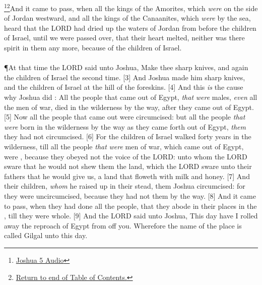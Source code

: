 \footnote{\href{https://audiobible.com/bible/joshua_5.html}{\textcolor[cmyk]{0.99998,1,0,0}{Joshua 5 Audio}}}\footnote{\textcolor[rgb]{0.00,0.25,0.00}{\hyperlink{TOC}{Return to end of Table of Contents.}}}\textcolor[cmyk]{0.99998,1,0,0}{And it came to pass, when all the kings of the Amorites, which \emph{were} on the side of Jordan westward, and all the kings of the Canaanites, which \emph{were} by the sea, heard that the LORD had dried up the waters of Jordan from before the children of Israel, until we were passed over, that their heart melted, neither was there spirit in them any more, because of the children of Israel.}\\
\\
\P \textcolor[cmyk]{0.99998,1,0,0}{At that time the LORD said unto Joshua, Make thee sharp knives, and  again the children of Israel the second time.}
[3] \textcolor[cmyk]{0.99998,1,0,0}{And Joshua made him sharp knives, and  the children of Israel at the hill of the foreskins.}
[4] \textcolor[cmyk]{0.99998,1,0,0}{And this \emph{is} the cause why Joshua did : All the people that came out of Egypt, \emph{that} \emph{were} males, \emph{even} all the men of war, died in the wilderness by the way, after they came out of Egypt.}
[5] \textcolor[cmyk]{0.99998,1,0,0}{Now all the people that came out were circumcised: but all the people \emph{that} \emph{were} born in the wilderness by the way as they came forth out of Egypt, \emph{them} they had not circumcised.}
[6] \textcolor[cmyk]{0.99998,1,0,0}{For the children of Israel walked forty years in the wilderness, till all the people \emph{that} \emph{were} men of war, which came out of Egypt, were , because they obeyed not the voice of the LORD: unto whom the LORD sware that he would not shew them the land, which the LORD sware unto their fathers that he would give us, a land that floweth with milk and honey.}
[7] \textcolor[cmyk]{0.99998,1,0,0}{And their children, \emph{whom} he raised up in their stead, them Joshua circumcised: for they were uncircumcised, because they had not  them by the way.}
[8] \textcolor[cmyk]{0.99998,1,0,0}{And it came to pass, when they had done  all the people, that they abode in their places in the , till they were whole.}
[9] \textcolor[cmyk]{0.99998,1,0,0}{And the LORD said unto Joshua, This day have I rolled away the reproach of Egypt from off you. Wherefore the name of the place is called Gilgal unto this day.}\\
